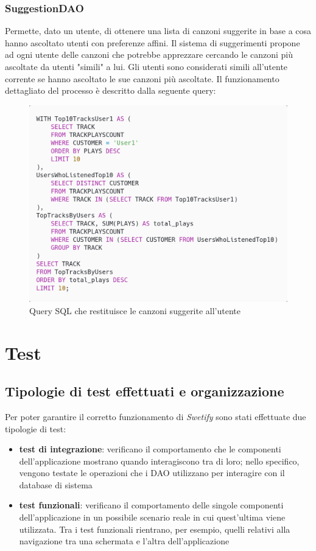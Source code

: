\documentclass{article}
\begin{document}
  \subsubsection{SuggestionDAO}
  Permette, dato un utente, di ottenere una lista di canzoni suggerite in base a cosa hanno ascoltato utenti con preferenze affini. Il sistema di suggerimenti propone ad ogni utente delle canzoni che potrebbe apprezzare cercando le canzoni più ascoltate da utenti "simili" a lui.
  Gli utenti sono considerati simili all'utente corrente se hanno ascoltato le sue canzoni più ascoltate.
  Il funzionamento dettagliato del processo è descritto dalla seguente query:
  \begin{figure}[H]
    \centering
    \includegraphics[width=0.7\linewidth]{query.png}
    \caption{Query SQL che restituisce le canzoni suggerite all'utente}
    \label{fig:query}
  \end{figure}



  \section{Test}

  \subsection{Tipologie di test effettuati e organizzazione}

  Per poter garantire il corretto funzionamento di \textit{Swetify} sono stati effettuate due tipologie di test:
  \begin{itemize}
    \item \textbf{test di integrazione}: verificano il comportamento che le componenti dell'applicazione mostrano quando interagiscono tra di loro; nello specifico, vengono testate le operazioni che i DAO utilizzano per interagire con il database di sistema
    \item \textbf{test funzionali}: verificano il comportamento delle singole componenti dell'applicazione in un possibile scenario reale in cui quest'ultima viene utilizzata. Tra i test funzionali rientrano, per esempio, quelli relativi alla navigazione tra una schermata e l'altra dell'applicazione
  \end{itemize}
\end{document}
